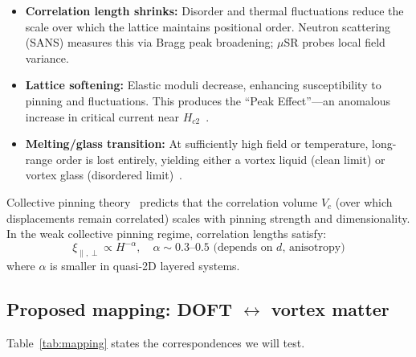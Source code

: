 \documentclass[reprint,aps,prb,superscriptaddress,floatfix]{revtex4-2}
\begin{document}
\begin{itemize}
\item \textbf{Correlation length shrinks:} Disorder and thermal fluctuations reduce the scale over which the lattice maintains positional order. Neutron scattering (SANS) measures this via Bragg peak broadening; $\mu$SR probes local field variance.

\item \textbf{Lattice softening:} Elastic moduli decrease, enhancing susceptibility to pinning and fluctuations. This produces the ``Peak Effect''---an anomalous increase in critical current near $H_{c2}$~\cite{Paltiel2000}.

\item \textbf{Melting/glass transition:} At sufficiently high field or temperature, long-range order is lost entirely, yielding either a vortex liquid (clean limit) or vortex glass (disordered limit)~\cite{Blatter1994,Guillamon2009}.
\end{itemize}

Collective pinning theory~\cite{LarkinOvchinnikov1979,Feigelman1989} predicts that the correlation volume $V_c$ (over which displacements remain correlated) scales with pinning strength and dimensionality. In the weak collective pinning regime, correlation lengths satisfy:
\begin{equation}
\xi_{\parallel,\perp} \propto H^{-\alpha}, \quad \alpha \sim 0.3\text{--}0.5 \text{ (depends on $d$, anisotropy)}
\label{eq:larkin}
\end{equation}
where $\alpha$ is smaller in quasi-2D layered systems.

\subsection{Proposed mapping: DOFT $\leftrightarrow$ vortex matter}

Table~\ref{tab:mapping} states the correspondences we will test.
\end{document}
